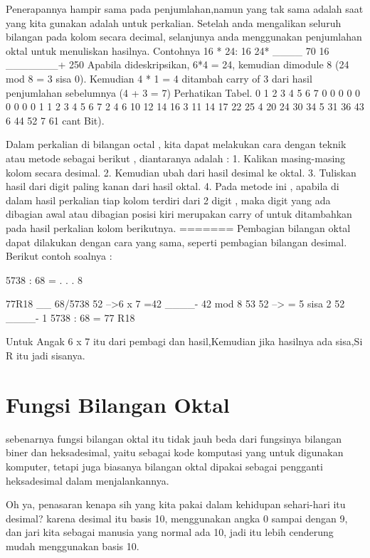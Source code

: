Penerapannya hampir sama pada penjumlahan,namun yang tak sama adalah saat yang kita gunakan adalah untuk perkalian. Setelah anda mengalikan seluruh bilangan pada kolom secara decimal, selanjunya anda menggunakan penjumlahan oktal untuk menuliskan hasilnya.
Contohnya 16 * 24:
16
24*
____
                70
             16
            _______+
            250
Apabila dideskripsikan, 6*4 = 24, kemudian dimodule 8 (24 mod 8 = 3 sisa 0). Kemudian 4 * 1 = 4 ditambah carry of 3 dari hasil penjumlahan sebelumnya (4 + 3 = 7)
Perhatikan Tabel.
0	1	2	3	4	5	6	7
0	0	0	0	0	0	0	0	0
1	1	2	3	4	5	6	7
2	4	6	10	12	14	16
3	11	14	17	22	25
4	20	24	30	34
5	31	36	43
6	44	52
7	61
cant Bit).

Dalam perkalian di bilangan octal , kita dapat melakukan cara dengan teknik atau metode sebagai berikut , diantaranya adalah :
1.	Kalikan masing-masing kolom secara desimal.
2.	Kemudian ubah dari hasil desimal ke oktal.
3.	Tuliskan hasil dari digit paling kanan dari hasil oktal.
4.	Pada metode ini , apabila di dalam hasil perkalian tiap kolom terdiri dari 2 digit , maka digit yang ada dibagian awal atau dibagian posisi kiri merupakan carry of untuk ditambahkan pada hasil perkalian kolom berikutnya.
=======
Pembagian bilangan oktal dapat dilakukan dengan cara yang sama, seperti pembagian bilangan desimal.
Berikut contoh soalnya :
	
5738 :  68 = . . . 8	
	 
	   77R18
	   __
	68/5738
	   52		-->6 x 7 =42
	   ____-	42 mod 8
	    53
	    52		--> = 5 sisa 2 52
	   ____-
	   	 1
5738 : 68 = 77 R18

Untuk Angak 6 x 7 itu dari pembagi dan hasil,Kemudian jika hasilnya ada sisa,Si R itu jadi sisanya.

\section{Fungsi Bilangan Oktal}

sebenarnya fungsi bilangan oktal itu tidak jauh beda dari fungsinya bilangan biner dan heksadesimal, yaitu sebagai kode komputasi yang untuk digunakan komputer, tetapi juga biasanya bilangan oktal dipakai sebagai pengganti heksadesimal dalam menjalankannya.

Oh ya, penasaran kenapa sih yang kita pakai dalam kehidupan sehari-hari itu desimal? karena desimal itu basis 10, menggunakan angka 0 sampai dengan 9, dan jari kita sebagai manusia yang normal ada 10, jadi itu lebih cenderung  mudah menggunakan basis 10.

